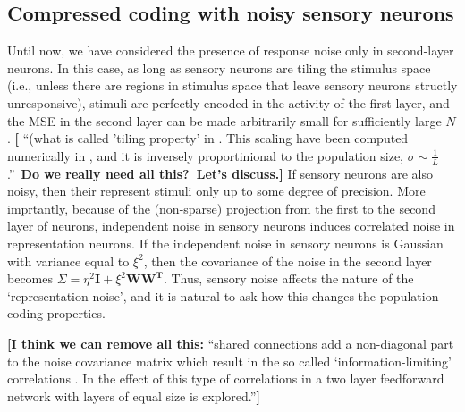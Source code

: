 \documentclass[a4paper]{article}%
\begin{document}
\subsection{Compressed coding with noisy sensory neurons}

\label{SuSe:In}

Until now, we have considered the presence of response noise only in
second-layer neurons. In this case, as long as sensory neurons are tiling the
stimulus space (i.e., unless there are regions in stimulus space that leave
sensory neurons structly unresponsive), stimuli are perfectly encoded in the
activity of the first layer, and the MSE in the second layer can be made
arbitrarily small for sufficiently large \thinspace$N$. \textbf{[}%
\textquotedblleft(what is called 'tiling property' in
\cite{Ganguli2014EfficientPopulations,Wei2013TheE}. This scaling have been
computed numerically in \cite{Berens2011ReassessingFunctions}, and it is
inversely proportinional to the population size, $\sigma\sim\frac{1}{L}%
$.\textquotedblright\ \textbf{Do we really need all this?\ Let's discuss.]} If
sensory neurons are also noisy, then their represent stimuli only up to some
degree of precision. More imprtantly, because of the (non-sparse) projection
from the first to the second layer of neurons, independent noise in sensory
neurons induces correlated noise in representation neurons. If the independent
noise in sensory neurons is Gaussian with variance equal to $\xi^{2}$, then
the covariance of the noise in the second layer becomes $\Sigma=\eta
^{2}\mathbf{I}+\xi^{2}\mathbf{WW^{T}}$. Thus, sensory noise affects the nature
of the `representation noise', and it is natural to ask how this changes the
population coding properties.

\textbf{[I think we can remove all this:} \textquotedblleft shared connections
add a non-diagonal part to the noise covariance matrix which result in the so
called `information-limiting' correlations
\cite{Moreno-Bote2014Information-limitingCorrelations}. In
\cite{Pernice2018InterpretationCircuits} the effect of this type of
correlations in a two layer feedforward network with layers of equal size is
explored.\textquotedblright\textbf{]}
\end{document}
